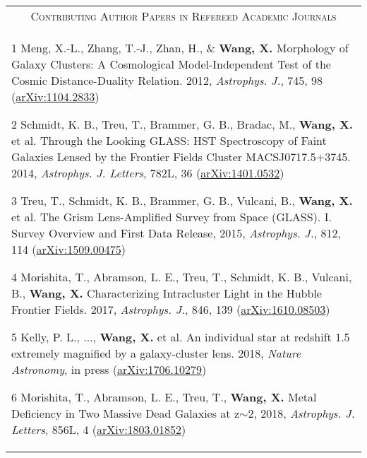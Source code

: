 \documentclass[letterpaper,10pt]{article}
\begin{document}
\begin{longtable}{p{6in}}
\multicolumn{1}{c}{\textsc{Contributing Author Papers in Refereed Academic Journals}}      \\
\vspace{-0.2cm}
\begin{list}{}{\leftmargin=0.5em}
    \item[1]\hypertarget{12.meng.apj}{} Meng, X.-L., Zhang, T.-J., Zhan, H., \& \textbf{Wang, X.} Morphology of Galaxy Clusters: A Cosmological Model-Independent Test of the Cosmic Distance-Duality Relation. 2012, \textit{Astrophys. J.}, 745, 98 (\href{http://arxiv.org/abs/1104.2833}{arXiv:1104.2833})
    \item[2]\hypertarget{14.schmidt.apjl}{} Schmidt, K. B., Treu, T., Brammer, G. B., Bradac, M., \textbf{Wang, X.} et al. Through the Looking GLASS: HST Spectroscopy of Faint Galaxies Lensed by the Frontier Fields Cluster MACSJ0717.5+3745. 2014, \textit{Astrophys. J. Letters}, 782L, 36 (\href{http://arxiv.org/abs/1401.0532}{arXiv:1401.0532})
    \item[3]\hypertarget{}{} Treu, T., Schmidt, K. B., Brammer, G. B., Vulcani, B., \textbf{Wang, X.} et al. The Grism 
    Lens-Amplified Survey from Space (GLASS). I. Survey Overview and First Data Release, 2015, \textit{Astrophys. J.}, 812, 114 
    (\href{https://arxiv.org/abs/1509.00475}{arXiv:1509.00475})
    \item[4]\hypertarget{}{} Morishita, T., Abramson, L. E., Treu, T., Schmidt, K. B., Vulcani, B., \textbf{Wang, X.} 
    Characterizing Intracluster Light in the Hubble Frontier Fields. 2017, \textit{Astrophys. J.}, 846, 139 
    (\href{https://arxiv.org/abs/1610.08503}{arXiv:1610.08503})
    \item[5]\hypertarget{}{} Kelly, P. L., ..., \textbf{Wang, X.} et al. An individual star at redshift 1.5 extremely magnified by 
    a galaxy-cluster lens. 2018, \textit{Nature Astronomy}, in press (\href{https://arxiv.org/abs/1706.10279}{arXiv:1706.10279})
    \item[6]\hypertarget{}{} Morishita, T., Abramson, L. E., Treu, T., \textbf{Wang, X.}  Metal Deficiency in Two Massive Dead 
    Galaxies at z$\sim$2, 2018, \textit{Astrophys. J. Letters}, 856L, 4 (\href{https://arxiv.org/abs/1803.01852}{arXiv:1803.01852})
\end{list}

\end{longtable}


\vspace{-1.5em}
\end{document}
